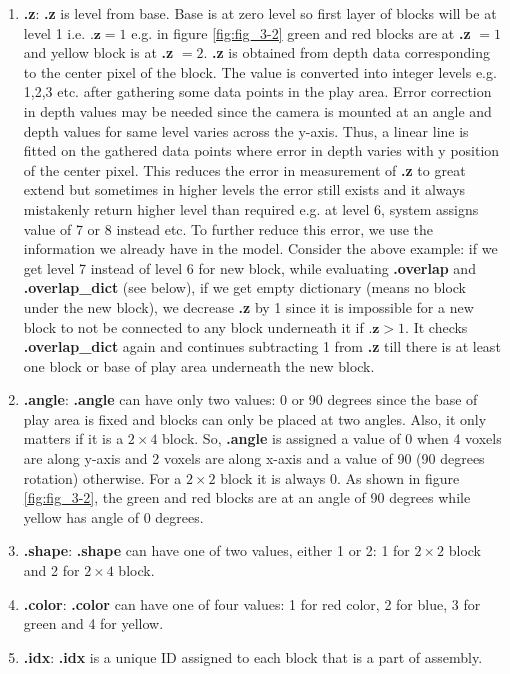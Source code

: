 \begin{enumerate}
\begin{enumerate}
        \item \textbf{.z}: \textbf{.z} is level from base. Base is at zero level so first layer of blocks will be at level 1 i.e. $\textbf{.z} = 1$ e.g. in figure \ref{fig:fig_3-2} green and red blocks are at \textbf{.z} $=1$ and yellow block is at \textbf{.z} $=2$. \textbf{.z} is obtained from depth data corresponding to the center pixel of the block. The value is converted into integer levels e.g. 1,2,3 etc. after gathering some data points in the play area. Error correction in depth values may be needed since the camera is mounted at an angle and depth values for same level varies across the y-axis. Thus, a linear line is fitted on the gathered data points where error in depth varies with y position of the center pixel. This reduces the error in measurement of \textbf{.z} to great extend but sometimes in higher levels the error still exists and it always mistakenly return higher level than required e.g. at level 6, system assigns value of 7 or 8 instead etc. To further reduce this error, we use the information we already have in the model. Consider the above example: if we get level 7 instead of level 6 for new block, while evaluating \textbf{.overlap} and \textbf{.overlap\_dict} (see below), if we get empty dictionary (means no block under the new block), we decrease \textbf{.z} by 1 since it is impossible for a new block to not be connected to any block underneath it if $\textbf{.z} > 1$. It checks \textbf{.overlap\_dict} again and continues subtracting 1 from \textbf{.z} till there is at least one block or base of play area underneath the new block.
        \item \textbf{.angle}: \textbf{.angle} can have only two values: 0 or 90 degrees since the base of play area is fixed and blocks can only be placed at two angles. Also, it only matters if it is a $2 \times 4$ block. So, \textbf{.angle} is assigned a value of 0 when 4 voxels are along y-axis and 2 voxels are along x-axis and a value of 90 (90 degrees rotation) otherwise. For a $2 \times 2$ block it is always 0.  As shown in figure \ref{fig:fig_3-2}, the green and red blocks are at an angle of 90 degrees while yellow has angle of 0 degrees.
        \item \textbf{.shape}: \textbf{.shape} can have one of two values, either 1 or 2:  1 for $2 \times 2$ block and 2 for $2 \times 4$ block.
        \item \textbf{.color}: \textbf{.color} can have one of four values: 1 for red color, 2 for blue, 3 for green and 4 for yellow.
        \item \textbf{.idx}: \textbf{.idx} is a unique ID assigned to each block that is a part of assembly. 

\end{enumerate}
\end{enumerate}
